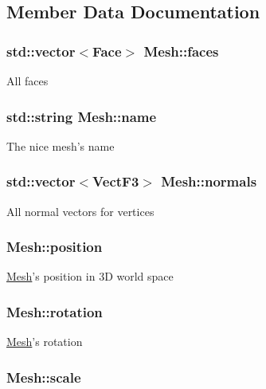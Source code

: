 \subsection{Member Data Documentation}
\hypertarget{classMesh_a9da199719905f2b213f8c0c8feba2d1f}{
\subsubsection[{faces}]{\setlength{\rightskip}{0pt plus 5cm}std\-::vector$<${\bf Face}$>$ Mesh\-::faces}}\label{classMesh_a9da199719905f2b213f8c0c8feba2d1f}
All faces \hypertarget{classMesh_ac687e9dcfc7cc60b046fc2ec634200be}{
\subsubsection[{name}]{\setlength{\rightskip}{0pt plus 5cm}std\-::string Mesh\-::name}}\label{classMesh_ac687e9dcfc7cc60b046fc2ec634200be}
The nice mesh's name \hypertarget{classMesh_a9aa46069bd2f977d5f3d088b2211f5d3}{
\subsubsection[{normals}]{\setlength{\rightskip}{0pt plus 5cm}std\-::vector$<${\bf Vect\-F3}$>$ Mesh\-::normals}}\label{classMesh_a9aa46069bd2f977d5f3d088b2211f5d3}
All normal vectors for vertices \hypertarget{classMesh_a0df7a55c33bf176617b0784990ccd997}{
\subsubsection[{position}]{ Mesh\-::position}}\label{classMesh_a0df7a55c33bf176617b0784990ccd997}
\hyperlink{classMesh}{Mesh}'s position in 3\-D world space \hypertarget{classMesh_a5707aace748c2a349a857ed28a3349b4}{
\subsubsection[{rotation}]{ Mesh\-::rotation}}\label{classMesh_a5707aace748c2a349a857ed28a3349b4}
\hyperlink{classMesh}{Mesh}'s rotation \hypertarget{classMesh_a5cc407d6c123d2fb84222ae1ebf4ab64}{
\subsubsection[{scale}]{ Mesh\-::scale}}\label{classMesh_a5cc407d6c123d2fb84222ae1ebf4ab64}
